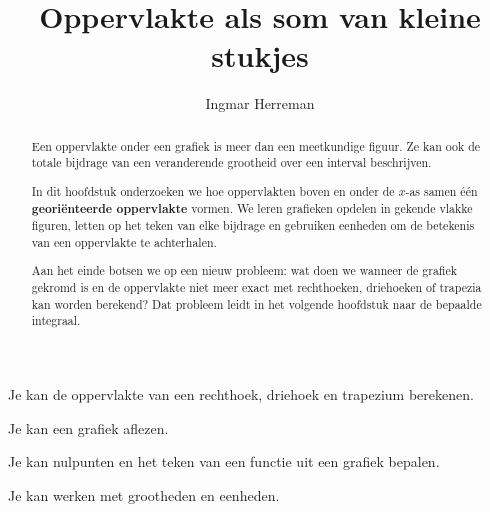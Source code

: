 \documentclass{ximera}
\title{Oppervlakte als som van kleine stukjes}
\author{Ingmar Herreman}
\begin{document}













\begin{abstract}
Een oppervlakte onder een grafiek is meer dan een meetkundige figuur.
Ze kan ook de totale bijdrage van een veranderende grootheid over een
interval beschrijven.

In dit hoofdstuk onderzoeken we hoe oppervlakten boven en onder de
\(x\)-as samen één \textbf{georiënteerde oppervlakte} vormen. We leren
grafieken opdelen in gekende vlakke figuren, letten op het teken van
elke bijdrage en gebruiken eenheden om de betekenis van een oppervlakte
te achterhalen.

Aan het einde botsen we op een nieuw probleem: wat doen we wanneer de
grafiek gekromd is en de oppervlakte niet meer exact met rechthoeken,
driehoeken of trapezia kan worden berekend? Dat probleem leidt in het
volgende hoofdstuk naar de bepaalde integraal.
\end{abstract}

\maketitle



\begin{voorkennis}
  \item Je kan de oppervlakte van een rechthoek, driehoek en trapezium berekenen.
  \item Je kan een grafiek aflezen.
  \item Je kan nulpunten en het teken van een functie uit een grafiek bepalen.
  \item Je kan werken met grootheden en eenheden.
\end{voorkennis}
\end{document}
